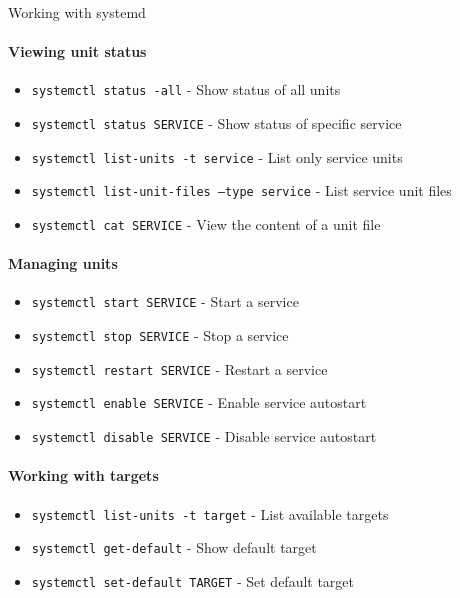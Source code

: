 \begin{KR}{Working with systemd}\\
    \paragraph{Viewing unit status}
    \begin{itemize}
        \item \texttt{systemctl status -all} - Show status of all units
        \item \texttt{systemctl status SERVICE} - Show status of specific service
        \item \texttt{systemctl list-units -t service} - List only service units
        \item \texttt{systemctl list-unit-files --type service} - List service unit files
        \item \texttt{systemctl cat SERVICE} - View the content of a unit file
    \end{itemize}
    
    \paragraph{Managing units}
    \begin{itemize}
        \item \texttt{systemctl start SERVICE} - Start a service
        \item \texttt{systemctl stop SERVICE} - Stop a service
        \item \texttt{systemctl restart SERVICE} - Restart a service
        \item \texttt{systemctl enable SERVICE} - Enable service autostart
        \item \texttt{systemctl disable SERVICE} - Disable service autostart
    \end{itemize}
    
    \paragraph{Working with targets}
    \begin{itemize}
        \item \texttt{systemctl list-units -t target} - List available targets
        \item \texttt{systemctl get-default} - Show default target
        \item \texttt{systemctl set-default TARGET} - Set default target
    \end{itemize}
\end{KR}


